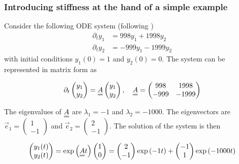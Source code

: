 \subsubsection{Introducing stiffness at the hand of a simple example}
\label{sec:stiffness_example}
Consider the following ODE system (following \cite[chapter 17.5]{press07})
\[
  \begin{aligned}
    \partial_t y_1 &= 998 y_1 + 1998 y_2 \\
    \partial_t y_2 &= -999y_1 - 1999 y_2
  \end{aligned}
\]
with initial conditions $y_1(0) = 1$ and $y_2(0) = 0$. The system can be represented in matrix form as

\[
  \partial_t \begin{pmatrix} y_1 \\ y_2 \end{pmatrix} = \mat{A} \begin{pmatrix} y_1 \\ y_2 \end{pmatrix}, \quad \mat{A} = \begin{pmatrix} 998 & 1998 \\ -999 & -1999 \end{pmatrix}
\]

The eigenvalues of $\mat{A}$ are $\lambda_1 = -1$ and $\lambda_2 = -1000$. The eigenvectors are $\vec{e}_1 = \begin{pmatrix} 1 \\ -1 \end{pmatrix}$ and $\vec{e}_2 = \begin{pmatrix} 2 \\ -1 \end{pmatrix}$. The solution of the system is then

\[
  \begin{pmatrix} y_1(t) \\ y_2(t) \end{pmatrix} = \exp{\left(\mat{A}t\right)} \begin{pmatrix} 1 \\ 0 \end{pmatrix} = \begin{pmatrix} 2 \\ -1 \end{pmatrix} \exp{\left(-1t\right)}  + \begin{pmatrix} -1 \\ 1 \end{pmatrix} \exp{\left(-1000t\right)}
\]

